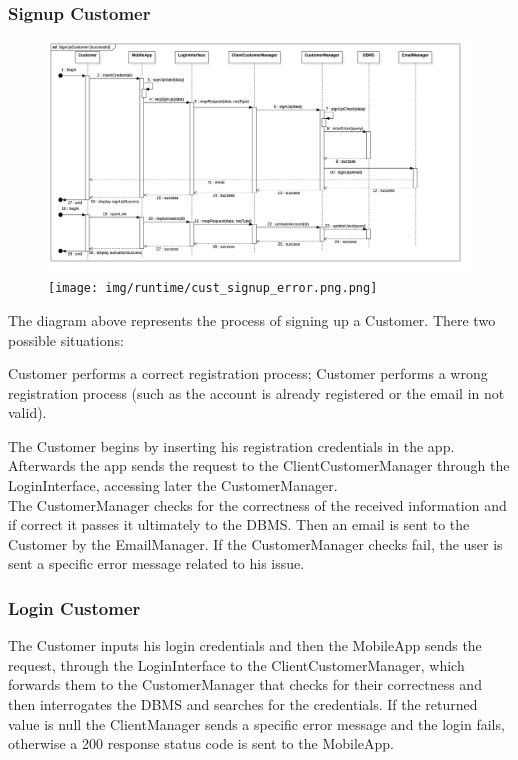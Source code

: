 \subsubsection{Signup Customer}
\begin{figure}[H]
    \begin{center}
        \includegraphics[width=\textwidth]{img/runtime/cust_signup_success.png}
        \texttt{[image: img/runtime/cust\_signup\_error.png.png]}

    \end{center}
\end{figure}
The diagram above represents the process of signing up a Customer. There two possible situations:
\begin{itemize}
\itemize Customer performs a correct registration process;
\itemize Customer performs a wrong registration process (such as the account is already registered or the email in not valid).
\end{itemize}
The Customer begins by inserting his registration credentials in the app. Afterwards the app sends the request to the ClientCustomerManager through the LoginInterface, accessing later the CustomerManager.\\
The CustomerManager checks for the correctness of the received information and if correct it passes it ultimately to the DBMS. Then an email is sent to the Customer by the EmailManager. If the CustomerManager checks fail, the user is sent a specific error message related to his issue.
\subsubsection{Login Customer}
The Customer inputs his login credentials and then the MobileApp sends the request, through the LoginInterface to the ClientCustomerManager, which forwards them to the CustomerManager that checks for their correctness and then interrogates the DBMS and searches for the credentials. If the returned value is null the ClientManager sends a specific error message and the login fails, otherwise a 200 response status code is sent to the MobileApp.
